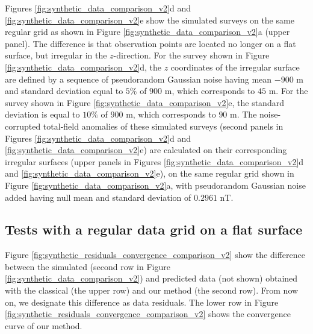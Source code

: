 \documentclass[manuscript,noblind]{geophysics}
\begin{document}

Figures \ref{fig:synthetic_data_comparison_v2}d and \ref{fig:synthetic_data_comparison_v2}e 
show the simulated surveys on the same regular grid as shown in Figure 
\ref{fig:synthetic_data_comparison_v2}a (upper panel). The difference is that observation points
are located no longer on a flat surface, but irregular in the $z$-direction.
For the survey shown in Figure \ref{fig:synthetic_data_comparison_v2}d, the $z$ coordinates 
of the irregular surface are defined by a sequence of pseudorandom Gaussian noise having mean 
$-900$ m and standard deviation equal to $5\%$ of $900$ m, which corresponds to $45$ m.
For the survey shown in Figure \ref{fig:synthetic_data_comparison_v2}e, the standard deviation 
is equal to $10\%$ of $900$ m, which corresponds to $90$ m.
The noise-corrupted total-field anomalies of these simulated surveys (second panels in Figures 
\ref{fig:synthetic_data_comparison_v2}d and \ref{fig:synthetic_data_comparison_v2}e) are calculated 
on their corresponding irregular surfaces (upper panels in Figures 
\ref{fig:synthetic_data_comparison_v2}d and \ref{fig:synthetic_data_comparison_v2}e),
on the same regular grid shown in Figure \ref{fig:synthetic_data_comparison_v2}a,
with pseudorandom Gaussian noise added having null mean and standard deviation of $0.2961$ nT.


\subsection*{Tests with a regular data grid on a flat surface}

Figure \ref{fig:synthetic_residuals_convergence_comparison_v2} show the 
difference between the simulated (second row in Figure \ref{fig:synthetic_data_comparison_v2})
and predicted data (not shown) obtained with the classical (the upper row) and 
our method (the second row). From now on, we designate this difference as data residuals. 
The lower row in Figure \ref{fig:synthetic_residuals_convergence_comparison_v2} shows the 
convergence curve of our method.
\end{document}
